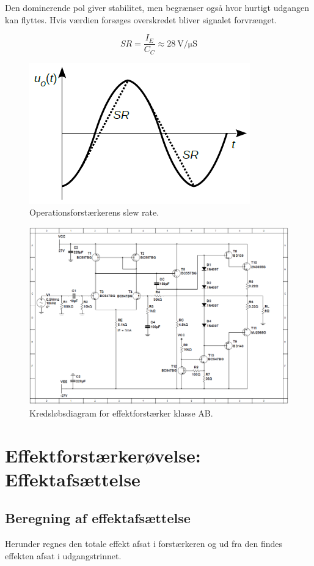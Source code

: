 \documentclass[danish]{article}
\begin{document}
Den dominerende pol giver stabilitet, men begrænser også hvor hurtigt udgangen kan flyttes. Hvis værdien forsøges overskredet bliver signalet forvrænget.

\begin{equation} 
SR = \dfrac{I_E}{C_C} \approx \SI{28}{\volt\per\micro\siemens}
\end{equation}

\begin{figure} [H]
	\centering
	\includegraphics[width=0.4\linewidth]{graphics/slewrate}
	\caption{Operationsforstærkerens slew rate.}
	\label{fig:slewrate}
\end{figure}


\begin{figure} [H]
	\centering
	\includegraphics[width=\linewidth]{graphics/PowerAmp_schematic}
	\caption{Kredsløbsdiagram for effektforstærker klasse AB.}
	\label{fig:PowerAmp_schematic1}
\end{figure}


\newpage
\section{Effektforstærkerøvelse: Effektafsættelse}
\subsection{Beregning af effektafsættelse}
Herunder regnes den totale effekt afsat i forstærkeren og ud fra den findes effekten afsat i udgangstrinnet.\\
\end{document}
